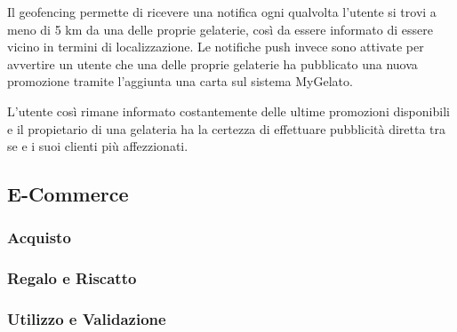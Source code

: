 Il geofencing permette di ricevere una notifica ogni qualvolta l'utente si trovi a meno di 5 km da una delle proprie gelaterie, così da essere informato di essere vicino in termini di localizzazione.
Le notifiche push invece sono attivate per avvertire un utente che una delle proprie gelaterie ha pubblicato una nuova promozione tramite l'aggiunta una carta sul sistema MyGelato.

L'utente così rimane informato costantemente delle ultime promozioni disponibili e il propietario di una gelateria ha la certezza di effettuare pubblicità diretta tra se e i suoi clienti più affezzionati.


\subsection{E-Commerce}


\subsubsection{Acquisto}

\subsubsection{Regalo e Riscatto}

\subsubsection{Utilizzo e Validazione}

\newpage
